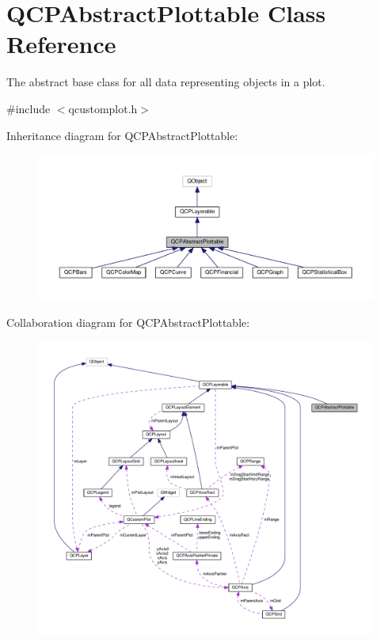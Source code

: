 \hypertarget{classQCPAbstractPlottable}{}\section{Q\+C\+P\+Abstract\+Plottable Class Reference}
\label{classQCPAbstractPlottable}


The abstract base class for all data representing objects in a plot.  




{\ttfamily \#include $<$qcustomplot.\+h$>$}



Inheritance diagram for Q\+C\+P\+Abstract\+Plottable\+:\nopagebreak
\begin{figure}[H]
\begin{center}
\leavevmode
\includegraphics[width=350pt]{classQCPAbstractPlottable__inherit__graph}
\end{center}
\end{figure}


Collaboration diagram for Q\+C\+P\+Abstract\+Plottable\+:\nopagebreak
\begin{figure}[H]
\begin{center}
\leavevmode
\includegraphics[width=350pt]{classQCPAbstractPlottable__coll__graph}
\end{center}
\end{figure}
